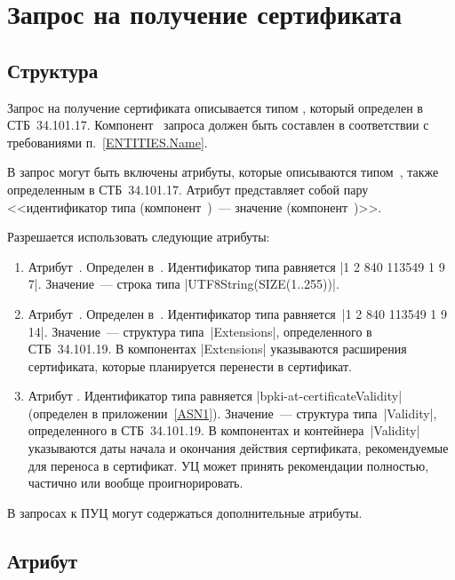 \section{Запрос на получение сертификата}\label{FMT.CSR}

\subsection{Структура}\label{FMT.CSR.Structure}

Запрос на получение сертификата описывается типом 
, который определен в СТБ~34.101.17. 
%
Компонент~ запроса должен быть составлен в соответствии
с требованиями п.~\ref{ENTITIES.Name}.

В запрос могут быть включены атрибуты, которые описываются 
типом~, также определенным в СТБ~34.101.17. 
Атрибут представляет собой пару <<идентификатор типа 
(компонент~)~--- значение (компонент~)>>.

Разрешается использовать следующие атрибуты:
\begin{enumerate}
\item
Атрибут~. Определен в~\cite{PKCS9}.
%
Идентификатор типа равняется \code|{1 2 840 113549 1 9 7}|.
Значение~--- строка типа \code|UTF8String(SIZE(1..255))|.

\item
Атрибут~. Определен в~\cite{PKCS9}.
%
Идентификатор типа равняется~\code|{1 2 840 113549 1 9 14}|.
Значение~--- структура типа~\code|Extensions|, определенного в СТБ~34.101.19.
В компонентах \code|Extensions| указываются расширения сертификата,
которые планируется перенести в сертификат.

\item
Атрибут .
Идентификатор типа равняется \code|bpki-at-certificateValidity|
(определен в приложении~\ref{ASN1}). Значение~--- структура 
типа~\code|Validity|, определенного в СТБ~34.101.19. 
%
В компонентах  и  контейнера~\code|Validity| 
указываются даты начала и окончания действия сертификата,
рекомендуемые для переноса в сертификат.
%
УЦ может принять рекомендации полностью, частично или вообще проигнорировать. 
\end{enumerate}

В запросах к ПУЦ могут содержаться дополнительные атрибуты.

\subsection{Атрибут~}\label{FMT.CSR.CP}

